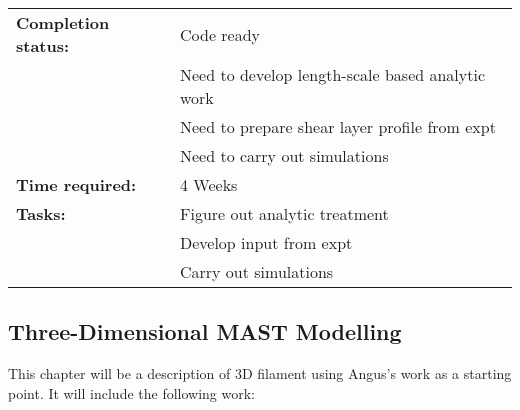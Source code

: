 \documentclass[11pt]{article}
\begin{document}
\begin{enumerate}
\begin{tabular}{l l}
\hline
\textbf{Completion status:} &  Code ready \\
 & Need to develop length-scale based analytic work \\
 & Need to prepare shear layer profile from expt\\
 & Need to carry out simulations\\
\hline
\textbf{Time required:} & 4 Weeks \\
\hline
\textbf{Tasks:}  & Figure out analytic treatment \\
 & Develop input from expt \\
 & Carry out simulations 
\end{tabular}
\end{enumerate}
\newpage
\subsection{Three-Dimensional MAST Modelling}
This chapter will be a description of 3D filament using Angus's work as a starting point. It will include the following work:
\end{document}
